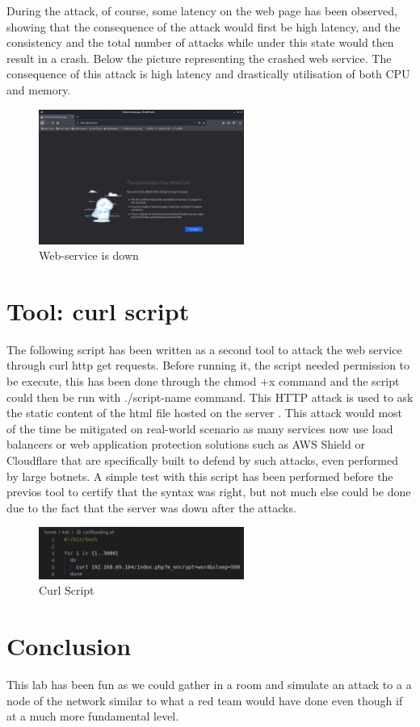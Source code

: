 During the attack, of course, some latency on the web page has been observed,
showing that the consequence of the attack would first be high latency, and the
consistency and the total number of attacks while under this state would then
result in a crash. Below the picture representing the crashed web service. The
consequence of this attack is high latency and drastically utilisation of both
CPU and memory.

\begin{figure}[H]
  \centering
  \includegraphics[width=0.6\textwidth]{figures/ddossonlywindow}
  \caption{Web-service is down}
  \label{f:web-service-down}
\end{figure}

\section{Tool: curl script}
\label{s:Tool-curl-script}

The following script has been written as a second tool to attack the web service
through curl http get requests. Before running it, the script needed permission
to be execute, this has been done through the chmod +x command and the script
could then be run with ./script-name command. This HTTP attack is used to ask
the static content of the html file hosted on the server
\citep{WhatHTTPFlood2020}. This attack would most of the time be mitigated on
real-world scenario as many services now use load balancers or web application
protection solutions such as AWS Shield or Cloudflare that are specifically
built to defend by such attacks, even performed by large botnets. A simple test
with this script has been performed before the previos tool to certify that the
syntax was right, but not much else could be done due to the fact that the
server was down after the attacks.

\begin{figure}[H]
  \centering
  \includegraphics[width=0.6\textwidth]{figures/curl-script}
  \caption{Curl Script}
  \label{f:curl-script}
\end{figure}

\section{Conclusion}
\label{s:Week3-Conclusion}
This lab has been fun as we could gather in a room and simulate an attack to a a
node of the network similar to what a red team would have done even though if at
a much more fundamental level.
